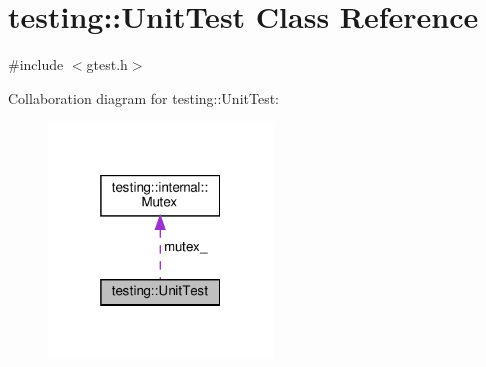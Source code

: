 \hypertarget{classtesting_1_1UnitTest}{}\section{testing\+:\+:Unit\+Test Class Reference}
\label{classtesting_1_1UnitTest}


{\ttfamily \#include $<$gtest.\+h$>$}



Collaboration diagram for testing\+:\+:Unit\+Test\+:\nopagebreak
\begin{figure}[H]
\begin{center}
\leavevmode
\includegraphics[width=169pt]{classtesting_1_1UnitTest__coll__graph}
\end{center}
\end{figure}
